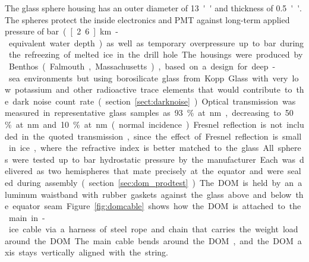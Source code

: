 The glass sphere housing has an outer diameter of \SI{13}{''} and thickness
of \SI{0.5}{''}.
The spheres protect the inside electronics and PMT against long-term applied pressure of 
\unit[250]bar (\unit[2.6]km-equivalent water depth)
as well as temporary overpressure up to \unit[690]bar during the refreezing of melted ice in the drill hole.
The housings were produced by Benthos (Falmouth, Massachusetts), based on a design for deep-sea
environments but using borosilicate glass from Kopp Glass
with very low potassium and other radioactive trace elements that would contribute to the dark noise
count rate (section~\ref{sect:darknoise}).  
Optical transmission was measured in representative glass samples as 93\% at \unit[400]nm,
decreasing to 50\% at \unit[340]nm and 10\% at \unit[315]nm (normal
incidence). Fresnel reflection is not included in the quoted
transmission, since the effect of Fresnel reflection is small in ice,
where the refractive index is better matched to the glass.


All spheres were tested up to \unit[690]bar hydrostatic pressure by the manufacturer.
Each was delivered as two hemispheres that mate precisely at the equator
and were sealed during assembly (section~\ref{sec:dom_prodtest}).  The DOM
is held by an aluminum waistband with rubber gaskets against 
the glass above and below the equator seam. 
Figure~\ref{fig:domcable} shows how the DOM is attached to the main in-ice cable via a harness
of steel rope and chain that carries the weight load around the DOM.
The main cable bends around the DOM, and the DOM axis stays vertically aligned with the string.

